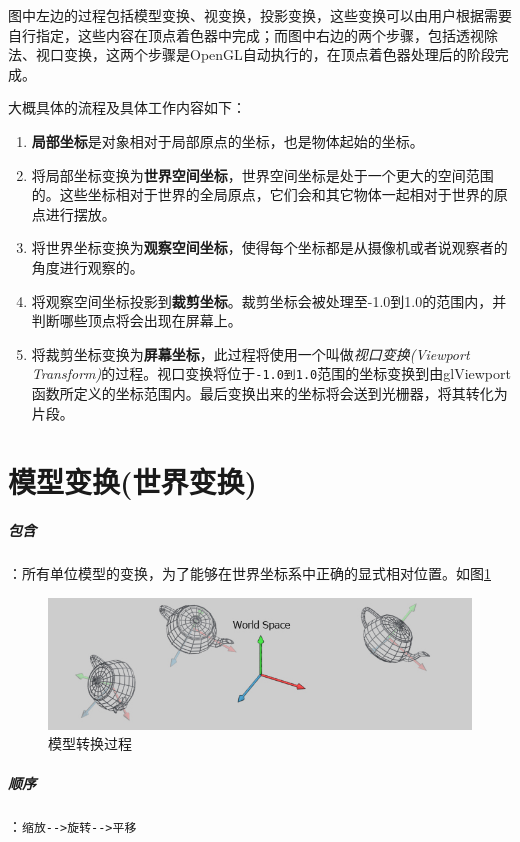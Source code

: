 \documentclass[UTF8,a4paper,12pt]{ctexbook}
\begin{document}
		图中左边的过程包括模型变换、视变换，投影变换，这些变换可以由用户根据需要自行指定，这些内容在顶点着色器中完成；而图中右边的两个步骤，包括透视除法、视口变换，这两个步骤是OpenGL自动执行的，在顶点着色器处理后的阶段完成。
		
		大概具体的流程及具体工作内容如下：
		\begin{enumerate}[itemindent = 1em]
			\item \textbf{局部坐标}是对象相对于局部原点的坐标，也是物体起始的坐标。
			\item 将局部坐标变换为\textbf{世界空间坐标}，世界空间坐标是处于一个更大的空间范围的。这些坐标相对于世界的全局原点，它们会和其它物体一起相对于世界的原点进行摆放。
			\item 将世界坐标变换为\textbf{观察空间坐标}，使得每个坐标都是从摄像机或者说观察者的角度进行观察的。
			\item 将观察空间坐标投影到\textbf{裁剪坐标}。裁剪坐标会被处理至-1.0到1.0的范围内，并判断哪些顶点将会出现在屏幕上。
			\item 将裁剪坐标变换为\textbf{屏幕坐标}，此过程将使用一个叫做\textit{视口变换(Viewport Transform)}的过程。视口变换将位于\verb|-1.0到1.0|范围的坐标变换到由glViewport函数所定义的坐标范围内。最后变换出来的坐标将会送到光栅器，将其转化为片段。		
		\end{enumerate}
		
		
		
	\section{模型变换(世界变换)}
			\subparagraph{包含}：所有单位模型的变换，为了能够在世界坐标系中正确的显式相对位置。如图\ref{mxzh}
				\begin{figure}[H]
					\centering
					\includegraphics[width=.8\linewidth]{transferModel.png}
					\caption{模型转换过程}
					\label{mxzh}
				\end{figure}
			
			\subparagraph{顺序}：\verb|缩放-->旋转-->平移|
		
\end{document}
